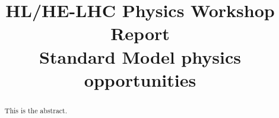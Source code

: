 \documentclass[11pt,twoside,a4paper]{cernrep}
\def\bibfiles{\main/bib/chapter,\main/section1/bib/section,\main/section2/bib/section}
\providecommand{\biblio}{\nocite{article-minimal}\clearpage}  %
\begin{document}
\newcommand{\main}{.}
\def\biblio{}

\title{HL/HE-LHC Physics Workshop Report \\[5mm]
  Standard Model physics opportunities}


\maketitle

\begin{abstract}
This is the abstract.
\end{abstract}

\setcounter{tocdepth}{2}
\tableofcontents
\newpage


\newpage

\newpage




\end{document}
